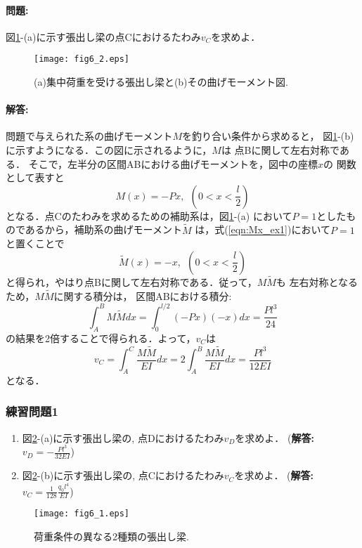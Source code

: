 ﻿\documentclass[10pt,a4j]{jarticle}
\begin{document}
\paragraph{問題:}
図\ref{fig:fig6_2}-(a)に示す張出し梁の点Cにおけるたわみ$v_C$を求めよ．
\begin{figure}[h]
	\begin{center}
	\texttt{[image: fig6\_2.eps]} 
	\end{center}
	\caption{(a)集中荷重を受ける張出し梁と(b)その曲げモーメント図.} 
	\label{fig:fig6_2}
\end{figure}
\paragraph{解答:}
問題で与えられた系の曲げモーメント$M$を釣り合い条件から求めると，
図\ref{fig:fig6_2}-(b)に示すようになる．この図に示されるように，$M$は
点Bに関して左右対称である．
そこで，左半分の区間ABにおける曲げモーメントを，図中の座標$x$の
関数として表すと
\begin{equation}
	M(x)=-Px,  \ \ \left(0< x < \frac{l}{2} \right) 
	\label{eqn:Mx_ex1}
\end{equation}
となる．点Cのたわみを求めるための補助系は，図\ref{fig:fig6_2}-(a)
において$P=1$としたものであるから，補助系の曲げモーメント$\tilde M$
は，式(\ref{eqn:Mx_ex1})において$P=1$と置くことで
\begin{equation}
	\tilde M(x)=-x,  \ \ \left(0< x < \frac{l}{2} \right) 
	\label{eqn:Mxt_ex1}
\end{equation}
と得られ，やはり点Bに関して左右対称である．従って，$M\tilde M$も
左右対称となるため，$M\tilde M$に関する積分は， 
区間ABにおける積分:
\begin{equation}
	\int _A^B M\tilde M dx = 
	\int_0^{l/2} (-Px)(-x) dx = \frac{Pl^3}{24}
	\label{eqn:}
\end{equation}
の結果を2倍することで得られる．よって，$v_C$は
\begin{equation}
	v_C=\int_A^C \frac{M \tilde M}{EI}dx
	=2\int_A^B \frac{M \tilde M}{EI}dx=
	\frac{Pl^3}{12EI}
	\label{eqn:}
\end{equation}
となる．
\subsubsection{練習問題1}
\begin{enumerate}
\item
	図\ref{fig:fig6_1}-(a)に示す張出し梁の, 点Dにおけるたわみ$v_D$を求めよ．
		({\bf 解答:}$v_D=-\frac{Pl^3}{32EI}$)
\item
	図\ref{fig:fig6_1}-(b)に示す張出し梁の, 点Cにおけるたわみ$v_C$を求めよ．
		({\bf 解答:}$v_C=\frac{1}{128}\frac{q_0l^4}{EI}$)
\end{enumerate}
\begin{figure}[h]
	\begin{center}
	\texttt{[image: fig6\_1.eps]} 
	\end{center}
	\caption{荷重条件の異なる2種類の張出し梁.} 
	\label{fig:fig6_1}
\end{figure}
\end{document}
